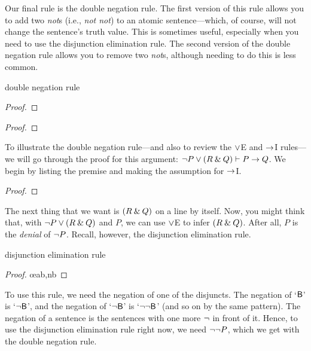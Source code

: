 Our final rule is the double negation rule. The first version of this rule allows you to add two \textit{not}s (i.e., \textit{not not}) to an atomic sentence---which, of course, will not change the sentence's truth value. This is sometimes useful, especially when you need to use the disjunction elimination rule. The second version of the double negation rule allows you to remove two \textit{not}s, although needing to do this is less common.

\begin{factboxy}{double negation rule}
\begin{proof}
	 
\end{proof}

\begin{proof}
	 
\end{proof}
\end{factboxy}

To illustrate the double negation rule---and also to review the $\vee$E and $\rightarrow$I rules---we will go through the proof for this argument: ${\neg} P \vee (R \mathbin{\&} Q) \vdash P \rightarrow Q$. We begin by listing the premise and making the assumption for $\rightarrow$I.

\begin{proof}
	 \pr{}	
	\open
		\as{}
\end{proof}
The next thing that we want is $(R \mathbin{\&} Q)$ on a line by itself. Now, you might think that, with ${\neg} P \vee (R \mathbin{\&} Q)$ and $P$, we can use $\vee$E to infer $(R \mathbin{\&} Q)$. After all, $P$ is the \textit{denial} of ${\neg} P$. Recall, however, the disjunction elimination rule.
\begin{factboxy}{disjunction elimination rule}
\begin{proof}
	 \oe{ab,nb}
\end{proof}
\end{factboxy}  
\noindent To use this rule, we need the negation of one of the disjuncts. The negation of `$\mathsf{B}$' is `${\neg}\mathsf{B}$', and the negation of 
`${\neg}\mathsf{B}$' is `${\neg}{\neg}\mathsf{B}$' (and so on by the same pattern). The negation of a sentence is the sentences with one more ${\neg}$ in front of it. Hence, to use the disjunction elimination rule right now, we need ${\neg}{\neg} P$, which we get with the double negation rule.

